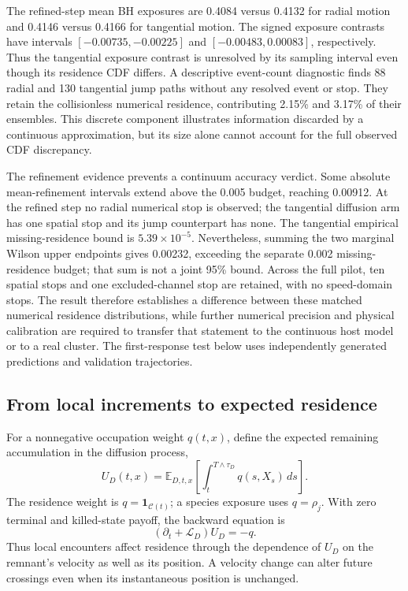 \documentclass[aps,prd,reprint,amsmath,amssymb,superscriptaddress,nofootinbib,longbibliography,floatfix]{revtex4-2}
\begin{document}
The refined-step mean BH exposures are 0.4084 versus 0.4132 for radial motion and 0.4146 versus 0.4166 for tangential motion. The signed exposure contrasts have intervals $[-0.00735,-0.00225]$ and $[-0.00483,0.00083]$, respectively. Thus the tangential exposure contrast is unresolved by its sampling interval even though its residence CDF differs. A descriptive event-count diagnostic finds 88 radial and 130 tangential jump paths without any resolved event or stop. They retain the collisionless numerical residence, contributing 2.15\% and 3.17\% of their ensembles. This discrete component illustrates information discarded by a continuous approximation, but its size alone cannot account for the full observed CDF discrepancy.

The refinement evidence prevents a continuum accuracy verdict. Some absolute mean-refinement intervals extend above the 0.005 budget, reaching 0.00912. At the refined step no radial numerical stop is observed; the tangential diffusion arm has one spatial stop and its jump counterpart has none. The tangential empirical missing-residence bound is $5.39\times10^{-5}$. Nevertheless, summing the two marginal Wilson upper endpoints gives 0.00232, exceeding the separate 0.002 missing-residence budget; that sum is not a joint 95\% bound. Across the full pilot, ten spatial stops and one excluded-channel stop are retained, with no speed-domain stops. The result therefore establishes a difference between these matched numerical residence distributions, while further numerical precision and physical calibration are required to transfer that statement to the continuous host model or to a real cluster. The first-response test below uses independently generated predictions and validation trajectories.

\subsection{From local increments to expected residence}

For a nonnegative occupation weight $q(t,x)$, define the expected remaining accumulation in the diffusion process,
\begin{equation}
U_D(t,x)=\mathbb E_{D,t,x}
\left[\int_t^{T\wedge\tau_D}q(s,X_s)\,ds\right].
\label{eq:backward-occupation}
\end{equation}
The residence weight is $q=\mathbf 1_{\mathcal C(t)}$; a species exposure uses $q=\rho_j$. With zero terminal and killed-state payoff, the backward equation is
\begin{equation}
(\partial_t+\mathcal L_D)U_D=-q.
\label{eq:backward-residence}
\end{equation}
Thus local encounters affect residence through the dependence of $U_D$ on the remnant's velocity as well as its position. A velocity change can alter future crossings even when its instantaneous position is unchanged.
\end{document}
